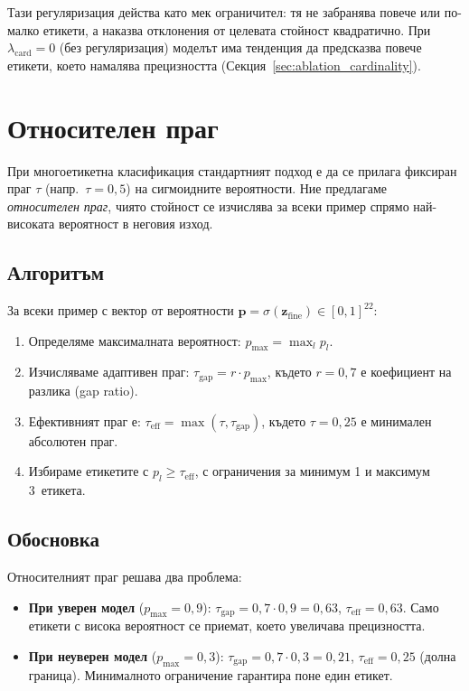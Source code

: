 \documentclass[12pt,a4paper]{report}
\begin{document}
Тази регуляризация действа като мек ограничител: тя не забранява повече или по-малко етикети, а наказва отклонения от целевата стойност квадратично. При $\lambda_{\text{card}}=0$ (без регуляризация) моделът има тенденция да предсказва повече етикети, което намалява прецизността (Секция~\ref{sec:ablation_cardinality}).


\section{Относителен праг}
\label{sec:adaptive_threshold}

При многоетикетна класификация стандартният подход е да се прилага фиксиран праг $\tau$ (напр.\ $\tau=0{,}5$) на сигмоидните вероятности. Ние предлагаме \textit{относителен праг}, чиято стойност се изчислява за всеки пример спрямо най-високата вероятност в неговия изход.

\subsection{Алгоритъм}

За всеки пример с вектор от вероятности $\mathbf{p} = \sigma(\mathbf{z}_{\text{fine}}) \in [0,1]^{22}$:
\begin{enumerate}
  \item Определяме максималната вероятност: $p_{\max} = \max_l p_l$.
  \item Изчисляваме адаптивен праг: $\tau_{\text{gap}} = r \cdot p_{\max}$, където $r=0{,}7$ е коефициент на разлика (gap ratio).
  \item Ефективният праг е: $\tau_{\text{eff}} = \max(\tau, \tau_{\text{gap}})$, където $\tau=0{,}25$ е минимален абсолютен праг.
  \item Избираме етикетите с $p_l \geq \tau_{\text{eff}}$, с ограничения за минимум 1 и максимум 3~етикета.
\end{enumerate}

\subsection{Обосновка}

Относителният праг решава два проблема:
\begin{itemize}
  \item \textbf{При уверен модел} ($p_{\max}=0{,}9$): $\tau_{\text{gap}} = 0{,}7 \cdot 0{,}9 = 0{,}63$, $\tau_{\text{eff}} = 0{,}63$. Само етикети с висока вероятност се приемат, което увеличава прецизността.
  \item \textbf{При неуверен модел} ($p_{\max}=0{,}3$): $\tau_{\text{gap}} = 0{,}7 \cdot 0{,}3 = 0{,}21$, $\tau_{\text{eff}} = 0{,}25$ (долна граница). Минималното ограничение гарантира поне един етикет.
\end{itemize}
\end{document}
